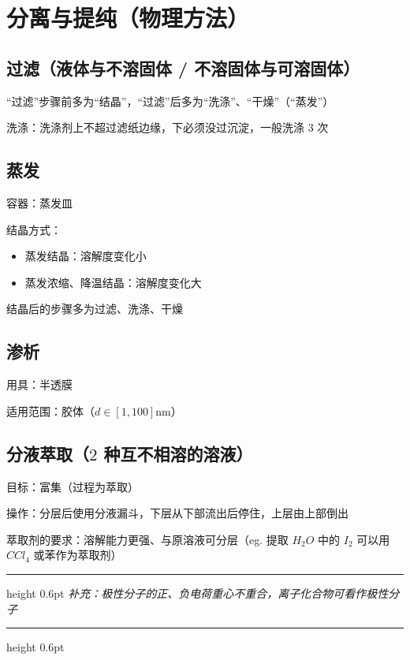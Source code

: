 \documentclass[UTF8,zihao=-4,openany]{ctexbook}
\newenvironment{notebox}
  {\par\smallskip\noindent\begingroup\begin{minipage}{\linewidth}\color{noteframe}\hrule height 0.6pt\smallskip\color{black}\itshape}
  {\par\smallskip\color{noteframe}\hrule height 0.6pt\end{minipage}\endgroup\par\smallskip}
\begin{document}
\section{分离与提纯（物理方法）}
\subsection{过滤（液体与不溶固体 / 不溶固体与可溶固体）}
“过滤”步骤前多为“结晶”，“过滤”后多为“洗涤”、“干燥”（“蒸发”）\par

洗涤：洗涤剂上不超过滤纸边缘，下必须没过沉淀，一般洗涤 $3$ 次\par
\subsection{蒸发}
容器：蒸发皿\par

结晶方式：\par
\begin{itemize}
\item 蒸发结晶：溶解度变化小
\end{itemize}

\begin{itemize}
\item 蒸发浓缩、降温结晶：溶解度变化大
\end{itemize}

结晶后的步骤多为过滤、洗涤、干燥\par
\subsection{渗析}
用具：半透膜\par

适用范围：胶体（$d\in [1,100]$nm）\par
\subsection{分液萃取（$2$ 种互不相溶的溶液）}
目标：富集（过程为萃取）\par

操作：分层后使用分液漏斗，下层从下部流出后停住，上层由上部倒出\par

萃取剂的要求：溶解能力更强、与原溶液可分层（eg. 提取 $H_2O$ 中的 $I_2$ 可以用 $CCl_4$ 或苯作为萃取剂）\par
\begin{notebox}
补充：极性分子的正、负电荷重心不重合，离子化合物可看作极性分子\par
\end{notebox}
\end{document}
